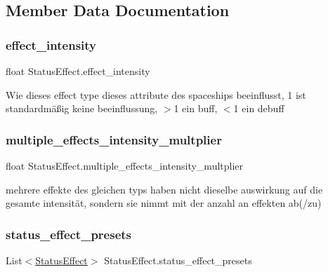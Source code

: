 \subsection{Member Data Documentation}
\mbox{\label{class_status_effect_a8440863026d4e9275ab2c701ddef7938}} 
\subsubsection{\texorpdfstring{effect\+\_\+intensity}{effect\_intensity}}
{\footnotesize\ttfamily float Status\+Effect.\+effect\+\_\+intensity}



Wie dieses effect type dieses attribute des spaceships beeinflusst, 1 ist standardmäßig keine beeinflussung, $>$1 ein buff, $<$1 ein debuff 

\mbox{\label{class_status_effect_a3504e8fd0ecb620a2678f5cce8660d44}} 
\subsubsection{\texorpdfstring{multiple\+\_\+effects\+\_\+intensity\+\_\+multplier}{multiple\_effects\_intensity\_multplier}}
{\footnotesize\ttfamily float Status\+Effect.\+multiple\+\_\+effects\+\_\+intensity\+\_\+multplier}



mehrere effekte des gleichen typs haben nicht dieselbe auswirkung auf die gesamte intensität, sondern sie nimmt mit der anzahl an effekten ab(/zu) 

\mbox{\label{class_status_effect_aa41970274c9d7217ce92fbed68a50583}} 
\subsubsection{\texorpdfstring{status\+\_\+effect\+\_\+presets}{status\_effect\_presets}}
{\footnotesize\ttfamily List$<$\hyperlink{class_status_effect}{Status\+Effect}$>$ Status\+Effect.\+status\+\_\+effect\+\_\+presets\hspace{0.3cm}{\ttfamily [static]}}

